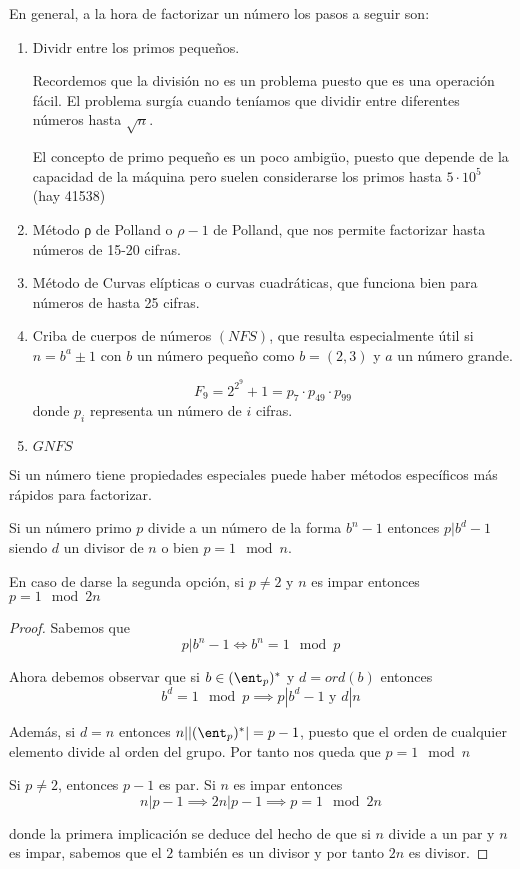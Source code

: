 En general, a la hora de factorizar un número los pasos a seguir son:
\begin{enumerate}
\item Dividr entre los primos pequeños.

Recordemos que la división no es un problema puesto que es una operación fácil. El problema surgía cuando teníamos que dividir entre diferentes números hasta $\sqrt{n}$.

El concepto de primo pequeño es un poco ambigüo, puesto que depende de la capacidad de la máquina pero suelen considerarse los primos hasta $5\cdot 10^{5}$ (hay 41538)

\item Método ρ de Polland o $ρ-1$ de Polland, que nos permite factorizar hasta números de 15-20 cifras.

\item Método de Curvas elípticas o curvas cuadráticas, que funciona bien para números de hasta 25 cifras.

\item Criba de cuerpos de números $(NFS)$, que resulta especialmente útil si $n=b^a\pm 1$ con $b$ un número pequeño como $b=(2,3)$ y $a$ un número grande.

\begin{example}
\[F_9 =2^{2^9}+1 = p_7\cdot p_{49} \cdot p_{99}\]
donde $p_i$ representa un número de $i$ cifras.
\end{example}

\item $GNFS$
\end{enumerate}

\obs Si un número tiene propiedades especiales puede haber métodos específicos más rápidos para factorizar.

\begin{prop}
Si un número primo $p$ divide a un número de la forma $b^n-1$ entonces $p|b^d-1$ siendo $d$ un divisor de $n$ o bien $p=1 \mod n$.

En caso de darse la segunda opción, si $p \neq 2$ y $n$ es impar entonces $p=1 \mod 2n$
\label{prop:pbn-1}
\end{prop}
\begin{proof}
Sabemos que
\[p|b^n-1 \iff b^n =1 \mod p\]

Ahora debemos observar que si $b \in (\ent_p)^*$ y $d=ord(b)$ entonces
\[b^d=1 \mod p \implies p|b^d-1 \text{ y } d|n\]

Además, si $d=n$ entonces $n||(\ent_p)^*|=p-1$, puesto que el orden de cualquier elemento divide al orden del grupo. Por tanto nos queda que $p=1\mod n$

Si $p\neq 2$, entonces $p-1$ es par. Si $n$ es impar entonces
\[n|p-1 \implies 2n|p-1 \implies p=1 \mod 2n\]

donde la primera implicación se deduce del hecho de que si $n$ divide a un par y $n$ es impar, sabemos que el $2$ también es un divisor y por tanto $2n$ es divisor.

\end{proof}

